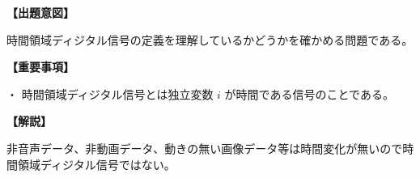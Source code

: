 \noindent \textbf{【出題意図】}

\noindent 時間領域ディジタル信号の定義を理解しているかどうかを確かめる問題である。

\vspace{1em}
\noindent \textbf{【重要事項】}

\medskip
\noindent ・ 時間領域ディジタル信号とは独立変数 $i$ が時間である信号のことである。

\vspace{1em}
\noindent \textbf{【解説】}

\noindent 非音声データ、非動画データ、動きの無い画像データ等は時間変化が無いので時間領域ディジタル信号ではない。
